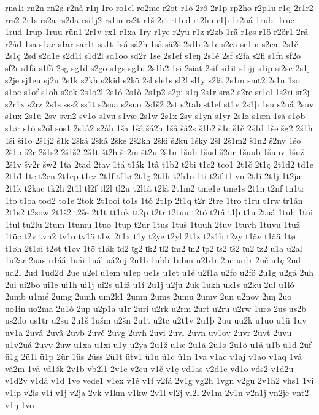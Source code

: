 rna1i
rn2n
rn2ø
r2nå
r1ŋ
1ro
ro1el
ro2me
r2ot
r1ò
2rô
2r1p
rp2ho
r2p1u
r1q
2r1r2
rrs2
2r1s
rs2a
rs2da
rsi1j2
rs1in
rs2t
r1š
2rt
rt1ed
rt2hu
r1þ
1r2uá
1rub.
1ruc
1rud
1rup
1ruu
rün1
2r1v
rx1
r1xa
1ry
r1ye
r2yu
r1z
r2zb
1rä
r1øs
r1ö
r2ör1
2rå
r2åd
1sa
s1ac
s1ar
sar1t
sa1t
1sá
sá2h
1sâ
sâ2š
2s1b
2s1c
s2ca
sc1in
s2cæ
2s1č
2s1ç
2sd
s2d1e
s2d1i
s1d2l
sd1oo
sd2r
1se
2s1ef
s1eŋ
2s1é
2sf
s2fa
s2fi
s1fn
sf2o
sf2r
s1fä
s1få
2sg
sg1d
s2go
s1gs
sg1u
2s1h2
1si
2siat
2sif
si1it
s1ijj
s1ip
si2se
2s1j
s2je
sj1eu
sj2u
2s1k
s2kh
s2kid
s2kö
2sl
sle1s
sl2f
sl1y
s2lä
2s1m
smt2
2s1n
1so
s1oc
s1of
s1oh
s2ok
2s1o2l
2s1ó
2s1ò
2s1p2
s2pi
s1q
2s1r
sra2
s2re
sr1el
1s2ri
sr2j
s2r1x
s2rz
2s1s
sss2
ss1t
s2sua
s2suo
2s1š2
2st
s2tab
st1ef
st1v
2s1þ
1su
s2uá
2suv
s1ux
2s1ü
2sv
svn2
sv1o
s1vu
s1væ
2s1w
2s1x
2sy
s1yn
s1yr
2s1z
s1æn
1sä
s1øb
s1ør
s1ö
s2öl
sös1
2s1å2
s2åh
1ša
1šá
šá2h
1šâ
šâ2s
š1b2
š1c
š1č
2š1d
1še
šg2
2š1h
1ši
ši1o
2š1j2
š1k
2šká
2škâ
2ške
2š2kh
2ški
š2ku
1šky
2šl
2š1m2
š1n2
š2ny
1šo
2š1p
š2r
2š1s2
2š1š2
2š1t
št2h
št2m
št2u
2š1u
1šub
1šud
š2ur
1šuub
1šuuv
1šuž
2š1v
šv2r
šw2
1ta
2tad
2tav
1tá
t1ák
1tâ
t1b2
t2bi
t1c2
tco1
2t1č
2t1ç
2t1d2
td1e
2t1đ
1te
t2en
2t1ep
t1ez
2t1f
tf1ø
2t1g
2t1h
t2h1o
1ti
t2if
t1ivn
2t1í
2t1j
1t2jæ
2t1k
t2kac
tk2h
2t1l
tl2f
tl2l
tl2u
t2l1ä
t2lå
2t1m2
tme1e
tme1s
2t1n
t2nf
tn1tr
1to
t1oa
tod2
to1e
2tok
2t1ooi
to1s
1tó
2t1p
2t1q
t2r
2tre
1tro
t1ru
t1rw
tr1ån
2t1s2
t2sow
2t1š2
t2še
2t1t
tt1ok
tt2p
t2tr
t2tuu
t2tö
t2tå
t1þ
t1u
2tuá
1tuh
1tui
1tul
tu2lu
2tum
1tumu
1tuo
1tup
t2ur
1tus
1tuš
1tuuh
2tuv
1tuvh
1tuvu
1tuž
1tüc
t2v
tvn2
tv1o
tv1ä
t1w
2t1x
t1y
t2ye
t2yl
2t1z
t2z1b
t2zy
t1äv
t1ää
1tø
t1øh
2t1øi
t2øt
t1øv
1tö
t1åk
ŧd2
ŧg2
ŧk2
ŧl2
ŧm2
ŧn2
ŧp2
ŧs2
ŧš2
ŧu2
ŧz2
u1a
u2al
1u2ar
2uas
u1áá
1uái
1uál
uá2nj
2u1b
1ubb
1ubm
u2b1r
2uc
uc1r
2uč
u1ç
2ud
ud2l
2uđ
1uđ2đ
2ue
u2el
u1em
u1ep
ue1s
u1et
u1é
u2f1a
u2fo
u2fö
2u1g
u2gå
2uh
2ui
ui2bo
ui1e
ui1h
ui1j
ui2s
u1iž
u1í
2u1j
u2ju
2uk
1ukh
uk1s
u2ku
2ul
u1ló
2umb
u1mé
2umg
2umh
um2k1
2umn
2ums
2umu
2umv
2un
u2nov
2uŋ
2uo
uo1in
uo2ma
2u1ó
2up
u2p1a
u1r
2uri
u2rk
u2rm
2urt
u2ru
u2rw
1urø
2us
us2b
us2do
us1tr
u2su
2u1š
1ušm
u2šn
2u1t
u2tc
u2t1v
2u1þ
2uu
uu2k
u1uo
u1ü
1uv
uv1a
2uvá
2uvâ
2uvb
2uvč
2uvg
2uvh
2uvi
2uvl
2uvn
uv1ov
2uvr
2uvt
2uvu
u1v2uá
2uvv
2uw
u1xa
u1xi
u1y
u2ya
2u1ž
u1æ
2u1ä
2u1ø
2u1ö
u1å
ü1b
ü1d
2üf
ü1g
2ü1l
ü1p
2ür
1üs
2üss
2ü1t
ütv1
ü1u
ú1c
û1n
1va
v1ac
v1aj
v1ao
v1aq
1vá
vá2m
1vâ
vâ1šk
2v1b
vb2l1
2v1c
v2cu
v1č
v1ç
vd1as
v2d1e
vd1o
vds2
v1d2u
v1d2v
v1då
v1đ
1ve
vede1
v1ex
v1é
v1f
v2fá
2v1g
vg2h
1vgn
v2gu
2v1h2
vhs1
1vi
v1ip
v2is
v1í
v1j
v2ja
2vk
v1km
v1kw
2v1l
vl2j
vl2l
2v1m
2v1n
v2n1j
vn2je
vnt2
v1ŋ
1vo
